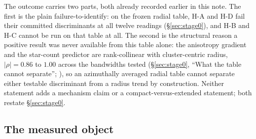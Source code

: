 \documentclass[11pt]{article}
\begin{document}
The outcome carries two parts, both already recorded earlier in this note. The first is the plain failure-to-identify: on the frozen radial table, H-A and H-D fail their committed discriminants at all twelve readings (\S\ref{sec:stage0}), and H-B and H-C cannot be run on that table at all. The second is the structural reason a positive result was never available from this table alone: the anisotropy gradient and the star-count predictor are rank-collinear with cluster-centric radius, $|\rho| = 0.86$ to $1.00$ across the bandwidths tested (\S\ref{sec:stage0}, ``What the table cannot separate''; \citep{AXIStage0Report2026}), so an azimuthally averaged radial table cannot separate either testable discriminant from a radius trend by construction. Neither statement adds a mechanism claim or a compact-versus-extended statement; both restate \S\ref{sec:stage0}.

\subsection{The measured object}
\label{sec:measured}
\end{document}
